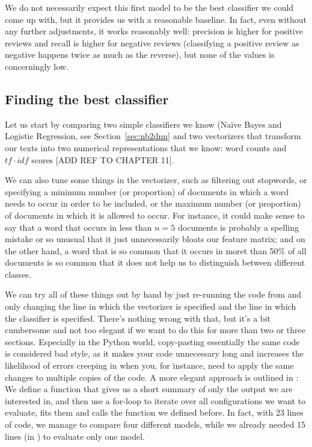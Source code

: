 
We do not necessarily expect this first model to be the best classifier we could come up with, but it provides us with a reasonable baseline. In fact, even without any further adjustments, it works reasonably well: precision is higher for positive reviews and recall is higher for negative reviews (classifying a positive review as negative happens twice as much as the reverse), but none of the values is concerningly low.




\subsection{Finding the best classifier}

Let us start by comparing two simple classifiers we know (Na\"ive
Bayes and Logistic Regression, see Section~\ref{sec:nb2dnn} and two
vectorizers that transform our texts into two numerical
representations that we know: word counts and $tf\cdot idf$ scores
[ADD REF TO CHAPTER 11].

We can also tune some things in the vectorizer, such as filtering out
stopwords, or specifying a minimum number (or proportion) of documents
in which a word needs to occur in order to be included, or the maximum
number (or proportion) of documents in which it is allowed to
occur. For instance, it could make sense to say that a word that
occurs in less than $n=5$ documents is probably a spelling mistake or
so unusual that it just unnecessarily bloats our feature matrix; and
on the other hand, a word that is so common that it occurs in moret
than 50\% of all documents is so common that it does not help us to
distinguish between different classes.

We can try all of these things out by hand by just re-running the code
from  and only changing the line in which the
vectorizer is specified and the line in which the classifier is
specified. There's nothing wrong with that, but it's a bit cumbersome
and not too elegant if we want to do this for more than two or three
sections. Especially in the Python world, copy-pasting essentially the
same code is considered bad style, as it makes your code unnecessary
long and increases the likelihood of errors creeping in when you, for
instance, need to apply the same changes to multiple copies of the
code.  A more elegant approach is outlined in
: We define a function that gives us a short
summary of only the output we are interested in, and then use a
for-loop to iterate over all configurations we want to evaluate, fits
them and calls the function we defined before. In fact, with 23 lines
of code, we manage to compare four different models, while we already
needed 15 lines (in ) to evaluate only one model.


